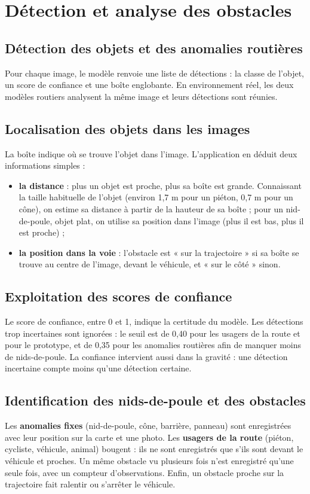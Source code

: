 \section{Détection et analyse des obstacles}

\subsection{Détection des objets et des anomalies routières}
Pour chaque image, le modèle renvoie une liste de détections : la classe de l'objet, un score de confiance et une
boîte englobante. En environnement réel, les deux modèles routiers analysent la même image et leurs détections
sont réunies.

\subsection{Localisation des objets dans les images}
La boîte indique où se trouve l'objet dans l'image. L'application en déduit deux informations simples :
\begin{itemize}
  \item \textbf{la distance} : plus un objet est proche, plus sa boîte est grande. Connaissant la taille habituelle
        de l'objet (environ 1,7 m pour un piéton, 0,7 m pour un cône), on estime sa distance à partir de la hauteur de
        sa boîte ; pour un nid-de-poule, objet plat, on utilise sa position dans l'image (plus il est bas, plus il est
        proche) ;
  \item \textbf{la position dans la voie} : l'obstacle est « sur la trajectoire » si sa boîte se trouve au centre de
        l'image, devant le véhicule, et « sur le côté » sinon.
\end{itemize}

\subsection{Exploitation des scores de confiance}
Le score de confiance, entre 0 et 1, indique la certitude du modèle. Les détections trop incertaines sont ignorées :
le seuil est de 0,40 pour les usagers de la route et pour le prototype, et de 0,35 pour les anomalies routières afin
de manquer moins de nids-de-poule. La confiance intervient aussi dans la gravité : une détection incertaine compte
moins qu'une détection certaine.

\subsection{Identification des nids-de-poule et des obstacles}
Les \textbf{anomalies fixes} (nid-de-poule, cône, barrière, panneau) sont enregistrées avec leur position sur la carte
et une photo. Les \textbf{usagers de la route} (piéton, cycliste, véhicule, animal) bougent : ils ne sont enregistrés
que s'ils sont devant le véhicule et proches. Un même obstacle vu plusieurs fois n'est enregistré qu'une seule fois,
avec un compteur d'observations. Enfin, un obstacle proche sur la trajectoire fait ralentir ou s'arrêter le véhicule.

